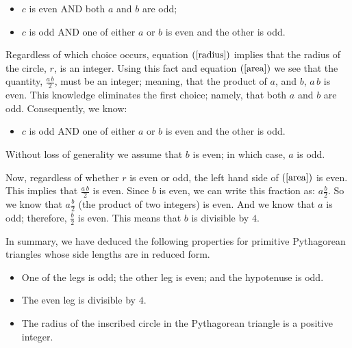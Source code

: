 \documentclass[12pt]{article}
\begin{document}
\begin{itemize}
  \item{$c$ is even AND both $a$ and $b$ are odd;}
  \item{$c$ is odd AND one of either $a$ or $b$ is even and the other is odd.}
\end{itemize}

Regardless of which choice occurs, equation $(\ref{radius})$ implies that 
the radius of the circle, $r$, is an integer.
\eject
Using this fact and equation $(\ref{area})$ we see that the quantity, 
$\frac{a \, b}{2}$, must be an integer; meaning, that the product 
of $a$, and $b$, $a \, b$ is even.
This knowledge eliminates the first choice; namely, that both $a$ and $b$ 
are odd. Consequently, we know:
\begin{itemize}
    \item{$c$ is odd AND one of either $a$ or $b$ is even and the other is odd.}
\end{itemize}
Without loss of generality we assume that $b$ is even; in which case, $a$ is odd.

Now, regardless of whether $r$ is even or odd, the left hand side of 
$(\ref{area})$ is even. This implies that $\frac{a \, b}{2}$
is even. Since $b$ is even, we can write this fraction as: $a \frac{b}{2}$.
So we know that $a \frac{b}{2}$ (the product of two integers) is even.
And we know that $a$ is odd; therefore, $\frac{b}{2}$ is even.
This means that $b$ is divisible by $4$.

In summary, we have deduced the following properties for primitive Pythagorean triangles
whose side lengths are in reduced form.
\begin{itemize}
  \item{One of the legs is odd; the other leg is even; and the hypotenuse 
      is odd.}
  \item{The even leg is divisible by $4$.}
  \item{The radius of the inscribed circle in the Pythagorean triangle
      is a positive integer.}
\end{itemize}
\end{document}
